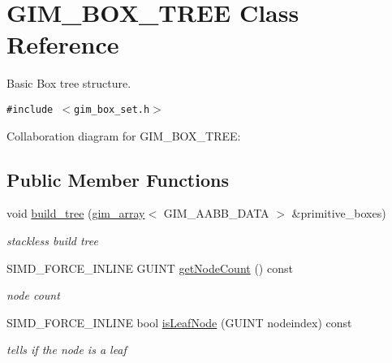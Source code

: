 \hypertarget{class_g_i_m___b_o_x___t_r_e_e}{
\section{GIM\_\-BOX\_\-TREE Class Reference}
\label{class_g_i_m___b_o_x___t_r_e_e}
}
Basic Box tree structure.  


{\tt \#include $<$gim\_\-box\_\-set.h$>$}

Collaboration diagram for GIM\_\-BOX\_\-TREE:\subsection*{Public Member Functions}
\begin{Indent}{\bf }\par
\begin{CompactItemize}
\item 
void \hyperlink{class_g_i_m___b_o_x___t_r_e_e_f76fa1d2f5e20c8979120fa72cf7575f}{build\_\-tree} (\hyperlink{classgim__array}{gim\_\-array}$<$ GIM\_\-AABB\_\-DATA $>$ \&primitive\_\-boxes)
\begin{CompactList}\small\item\em stackless build tree \item\end{CompactList}\item 
\hypertarget{class_g_i_m___b_o_x___t_r_e_e_ca02d76bac47e019fd728a5871951d14}{
SIMD\_\-FORCE\_\-INLINE GUINT \hyperlink{class_g_i_m___b_o_x___t_r_e_e_ca02d76bac47e019fd728a5871951d14}{getNodeCount} () const }
\label{class_g_i_m___b_o_x___t_r_e_e_ca02d76bac47e019fd728a5871951d14}

\begin{CompactList}\small\item\em node count \item\end{CompactList}\item 
\hypertarget{class_g_i_m___b_o_x___t_r_e_e_cdbffa778ffd8cc69f5c17f5540c9fd1}{
SIMD\_\-FORCE\_\-INLINE bool \hyperlink{class_g_i_m___b_o_x___t_r_e_e_cdbffa778ffd8cc69f5c17f5540c9fd1}{isLeafNode} (GUINT nodeindex) const }
\label{class_g_i_m___b_o_x___t_r_e_e_cdbffa778ffd8cc69f5c17f5540c9fd1}

\begin{CompactList}\small\item\em tells if the node is a leaf \item\end{CompactList}\end{CompactItemize}
\end{Indent}



